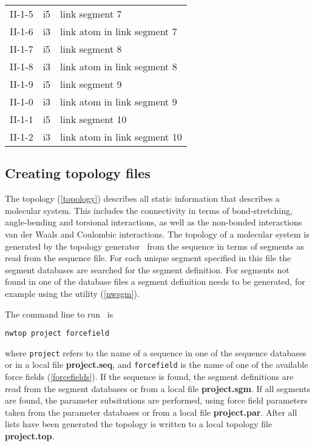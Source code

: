 \begin{center}
\begin{tabular*}{150mm}{p{12mm}p{12mm}l}
II-1-5 & i5     & link segment 7\\
II-1-6 & i3     & link atom in link segment 7\\
II-1-7 & i5     & link segment 8\\
II-1-8 & i3     & link atom in link segment 8\\
II-1-9 & i5     & link segment 9\\
II-1-0 & i3     & link atom in link segment 9\\
II-1-1 & i5     & link segment 10\\
II-1-2 & i3     & link atom in link segment 10\\
\hline\hline
\end{tabular*}
\end{center}
\subsection{Creating topology files}
\label{nwtop}
\par
The topology (\ref{topology}) describes all static information
that describes a molecular system. This includes the connectivity in
terms of bond-stretching, angle-bending and torsional interactions, as well as
the non-bonded interactions van der Waals and Coulombic interactions.
The topology of a molecular system is generated by the topology
generator \nwtop\ from the sequence in terms of segments as read from
the sequence file. For each unique segment specified in this file the 
segment databases are searched for the segment definition. For
segments not found in one of the database files a segment definition
needs to be generated, for example using the utility \nwsgm (\ref{nwsgm}).
\par
The command line to run \nwtop\ is
\begin{verbatim}
nwtop project forcefield
\end{verbatim}
where {\tt project} refers to the name of a sequence in one of the
sequence databases or in a local file {\bf project.seq}, and
{\tt forcefield} is the name of one of the available force fields 
(\ref{forcefields}).
If the sequence is found, the segment definitions are read from the
segment databases or from a local file {\bf project.sgm}. If all
segments are found, the parameter subsitutions are performed, using
force field parameters taken from the parameter databases or from a 
local file {\bf project.par}. After all lists have been generated the
topology is written to a local topology file {\bf project.top}.

